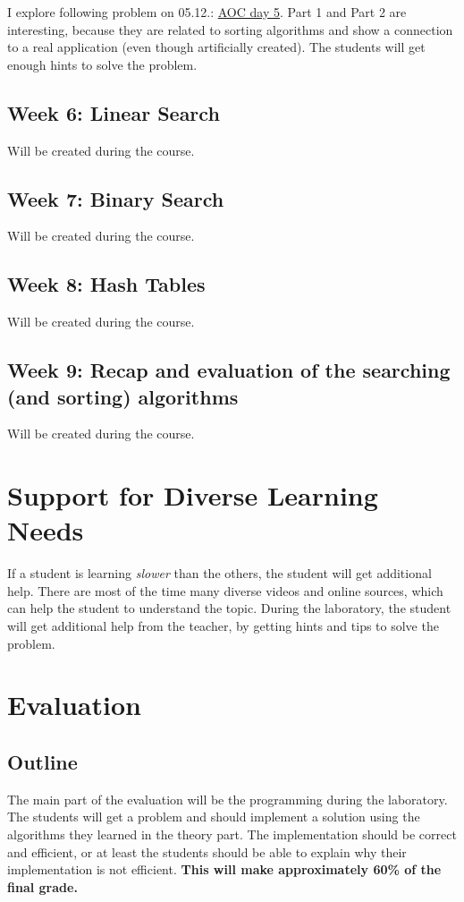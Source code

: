 \documentclass[10pt, oneside]{article}
\theoremstyle{remark}
\begin{document}
I explore following problem on 05.12.: \href{https://adventofcode.com/2024/day/5}{AOC day 5}. Part 1 and Part 2 are interesting, because they are related to sorting algorithms and show a connection to a real application (even though artificially created). The students will get enough hints to solve the problem. 

\subsection{Week 6: Linear Search}
Will be created during the course.

\subsection{Week 7: Binary Search}
Will be created during the course.

\subsection{Week 8: Hash Tables}
Will be created during the course.

\subsection{Week 9: Recap and evaluation of the searching (and sorting) algorithms}
Will be created during the course.

\section{Support for Diverse Learning Needs}
If a student is learning \textit{slower} than the others, the student will get additional help. There are most of the time many diverse videos and online sources, which can help the student to understand the topic. During the laboratory, the student will get additional help from the teacher, by getting hints and tips to solve the problem.

\section{Evaluation}
\subsection{Outline}
The main part of the evaluation will be the programming during the laboratory. The students will get a problem and should implement a solution using the algorithms they learned in the theory part. The implementation should be correct and efficient, or at least the students should be able to explain why their implementation is not efficient. \textbf{This will make approximately 60\% of the final grade.}
\end{document}
